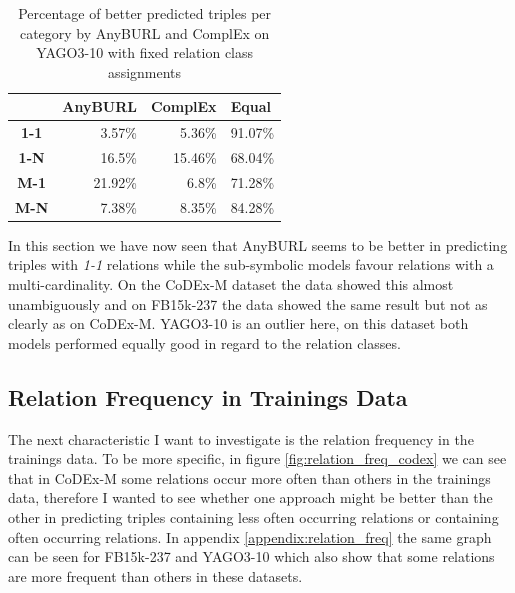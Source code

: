 \begin{table}[H]
\centering
\begin{tabular}{c|rrr}
\multicolumn{1}{l|}{} & \multicolumn{1}{c}{\textbf{AnyBURL}} & \multicolumn{1}{c}{\textbf{ComplEx}} & \multicolumn{1}{l}{\textbf{Equal}} \\ \hline
\textbf{1-1} & 3.57\% & 5.36\% & 91.07\% \\
\textbf{1-N} & 16.5\% & 15.46\% & 68.04\% \\
\textbf{M-1} & 21.92\% & 6.8\% & 71.28\% \\
\textbf{M-N} & 7.38\% & 8.35\% & 84.28\%
\end{tabular}
\caption{Percentage of better predicted triples per category by AnyBURL and ComplEx on YAGO3-10 with fixed relation class assignments}
\label{tab:relation_class_cleaned_anyburl_complex_yago}
\end{table}

In this section we have now seen that AnyBURL seems to be better in predicting triples with \textit{1-1} relations while the sub-symbolic models favour relations with a multi-cardinality. On the CoDEx-M dataset the data showed this almost unambiguously and on FB15k-237 the data showed the same result but not as clearly as on CoDEx-M. YAGO3-10 is an outlier here, on this dataset both models performed equally good in regard to the relation classes.

\subsection{Relation Frequency in Trainings Data}
The next characteristic I want to investigate is the relation frequency in the trainings data. To be more specific, in figure \ref{fig:relation_freq_codex} we can see that in CoDEx-M some relations occur more often than others in the trainings data, therefore I wanted to see whether one approach might be better than the other in predicting triples containing less often occurring relations or containing often occurring relations. In appendix \ref{appendix:relation_freq} the same graph can be seen for FB15k-237 and YAGO3-10 which also show that some relations are more frequent than others in these datasets. 

